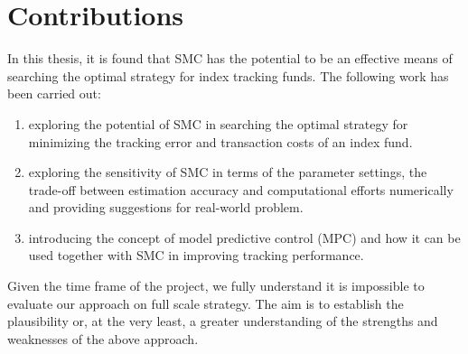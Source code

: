 \section{Contributions}
In this thesis, it is found that SMC has the potential to be an effective means of searching the optimal strategy for index tracking funds. The following work has been carried out:
\begin{enumerate}
\item exploring the potential of SMC in searching the optimal strategy for minimizing the tracking error and transaction costs of an index fund. 
\item exploring the sensitivity of SMC in terms of the parameter settings, the trade-off between estimation accuracy and computational efforts numerically and providing suggestions for real-world problem.
\item introducing the concept of model predictive control (MPC) and how it can be used together with SMC in improving tracking performance.
\end{enumerate}

Given the time frame of the project, we fully understand it is impossible to evaluate our approach on full scale strategy. The aim is to establish the plausibility or, at the very least, a greater understanding of the strengths and weaknesses of the above approach.

